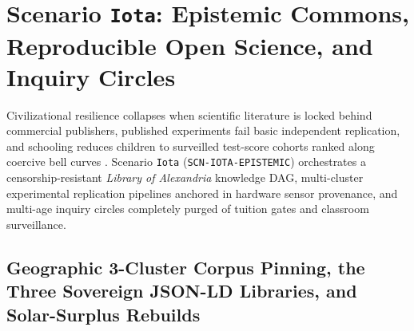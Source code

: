 \section{Scenario \texttt{Iota}: Epistemic Commons, Reproducible Open Science, and Inquiry Circles}
\label{sec:scn-iota}

Civilizational resilience collapses when scientific literature is locked behind commercial publishers,
published experiments fail basic independent replication, and schooling reduces children to surveilled
test-score cohorts ranked along coercive bell curves \parencite{illich1973,corbett1995bkt}. Scenario
\texttt{Iota} (\texttt{SCN-IOTA-EPISTEMIC}) orchestrates a censorship-resistant \emph{Library of
Alexandria} knowledge DAG, multi-cluster experimental replication pipelines anchored in hardware sensor
provenance, and multi-age inquiry circles completely purged of tuition gates and classroom surveillance.

\subsection{Geographic 3-Cluster Corpus Pinning, the Three Sovereign JSON-LD Libraries, and Solar-Surplus Rebuilds}

